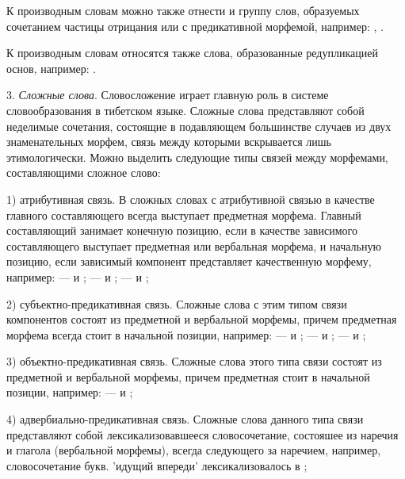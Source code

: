 К производным словам можно также отнести и группу слов, образуемых сочетанием частицы отрицания  или  с предикативной морфемой, например: , .

К производным словам относятся также слова, образованные редупликацией основ, например: .

3. \emph{Сложные слова}. Словосложение играет главную роль в системе словообразования в тибетском языке. Сложные слова представляют собой неделимые сочетания, состоящие в подавляющем большинстве случаев из двух знаменательных морфем, связь между которыми вскрывается лишь этимологически. Можно выделить следующие типы связей между морфемами, составляющими сложное слово:

1) атрибутивная связь. В сложных словах с атрибутивной связью в качестве главного составляющего всегда выступает предметная морфема. Главный составляющий занимает конечную позицию, если в качестве зависимого составляющего выступает предметная или вербальная морфема, и начальную позицию, если зависимый компонент представляет качественную морфему, например: 
 ---  и ;
 ---  и ;
 ---  и ;

2) субъектно-предикативная связь. Сложные слова с этим типом связи компонентов состоят из предметной и вербальной морфемы, причем предметная морфема всегда стоит в начальной позиции, например:
 ---  и ;
 ---  и ;
 ---  и ;

3) объектно-предикативная связь. Сложные слова этого типа связи состоят из предметной и вербальной морфемы, причем предметная стоит в начальной позиции, например:  ---  и ;

4) адвербиально-предикативная связь. Сложные слова данного типа связи представляют собой лексикализовавшееся словосочетание, состояшее из наречия и глагола (вербальной морфемы), всегда следующего за наречием, например, словосочетание  букв. 'идущий впереди'	лексикализовалось в ;

